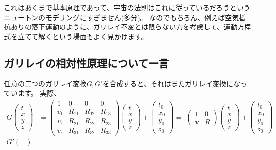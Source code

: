 これはあくまで基本原理であって、宇宙の法則はこれに従っているだろうというニュートンのモデリングにすぎません(多分)。
なのでもちろん、例えば空気抵抗ありの落下運動のように、ガリレイ不変とは限らない力を考慮して、運動方程式を立てて解くという場面もよく見かけます。

\subsection{ガリレイの相対性原理について一言}

任意の二つのガリレイ変換$G,G'$を合成すると、それはまたガリレイ変換になっています。
実際、
\begin{align*}
  G
  \begin{pmatrix}
    t\\x\\y\\z
  \end{pmatrix}&=
  \begin{pmatrix}
    1 & 0 & 0 & 0 \\
    v_1 & R_{11} & R_{12} & R_{13} \\
    v_2 & R_{21} & R_{22} & R_{23} \\
    v_3 & R_{31} & R_{32} & R_{33}
  \end{pmatrix}
  \begin{pmatrix}
    t\\x\\y\\z
  \end{pmatrix}
  +
  \begin{pmatrix}
    t_0\\x_0\\y_0\\z_0
  \end{pmatrix}=:
  \begin{pmatrix}
    1 & 0 \\
    \mathbf{v} & R
  \end{pmatrix}
  \begin{pmatrix}
    t\\x\\y\\z
  \end{pmatrix}
  +
  \begin{pmatrix}
    t_0\\x_0\\y_0\\z_0
  \end{pmatrix}\\
  G'
  \begin{pmatrix}

\end{pmatrix}
\end{align*}

